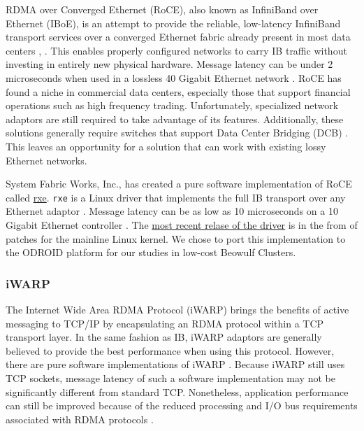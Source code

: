 \documentclass[11pt]{book}
\begin{document}
RDMA over Converged Ethernet (RoCE), also known as InfiniBand over Ethernet
(IBoE), is an attempt to provide the reliable, low-latency InfiniBand transport
services over a converged Ethernet fabric already present in most data centers
\cite{InfiniBandTARoCE-10}, \cite{roce-announce}. This enables properly
configured networks to carry IB traffic without investing in entirely new
physical hardware. Message latency can be under 2 microseconds when used in a
lossless 40 Gigabit Ethernet network \cite{vienne-12}. RoCE has found a niche in
commercial data centers, especially those that support financial operations such
as high frequency trading. Unfortunately, specialized network adaptors are still
required to take advantage of its features. Additionally, these solutions
generally require switches that support Data Center Bridging (DCB)
\cite{InfiniBandTARoCE-10}. This leaves an opportunity for a solution that can
work with existing lossy Ethernet networks.

System Fabric Works, Inc., has created a pure software implementation of RoCE
called \href{http://www.systemfabricworks.com/downloads/roce}{rxe}. \verb;rxe;
is a Linux driver that implements the full IB transport over any Ethernet
adaptor \cite{pearson-10}. Message latency can be as low as 10
microseconds on a 10 Gigabit Ethernet controller \cite{pearson-10}. The
\href{http://support.systemfabricworks.com/downloads/rxe/}{most recent relase of
  the driver} is in the from of patches for the mainline Linux kernel. We chose
to port this implementation to the ODROID platform for our studies in low-cost
Beowulf Clusters.

\subsubsection{\textbf{iWARP}}

The Internet Wide Area RDMA Protocol (iWARP) brings the benefits of active
messaging to TCP/IP by encapsulating an RDMA protocol within a TCP transport
layer. In the same fashion as IB, iWARP adaptors are generally believed to
provide the best performance when using this protocol. However, there are pure
software implementations of iWARP \cite{neeser-10}. Because iWARP still uses TCP
sockets, message latency of such a software implementation may not be
significantly different from standard TCP. Nonetheless, application performance
can still be improved because of the reduced processing and I/O bus requirements
associated with RDMA protocols \cite{narravula-07}.
\end{document}
